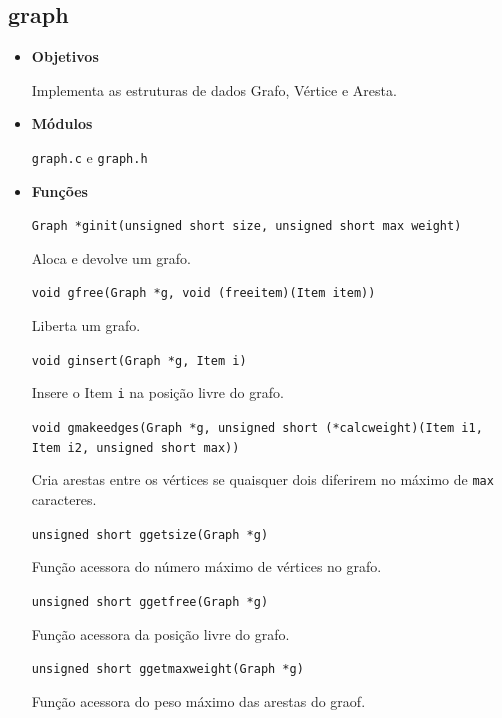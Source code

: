 \documentclass[portuguese, a4paper]{article}
\newcommand\tu[0]{\textunderscore}
\begin{document}
	\subsection{graph}
	\begin{itemize}
		\item \textbf{Objetivos}
		\par
		Implementa as estruturas de dados Grafo, Vértice e Aresta.

		\item \textbf{Módulos}
		\par
		\texttt{graph.c} e \texttt{graph.h}

		\item \textbf{Funções}
		\par
		\texttt{Graph *g\tu init(unsigned short size, unsigned short max\tu
		weight)}
		\par
		Aloca e devolve um grafo.

		\par\null\par
		\texttt{void g\tu free(Graph *g, void (free\tu item)(Item item))}
		\par
		Liberta um grafo.

		\par\null\par
		\texttt{void g\tu insert(Graph *g, Item i)}
		\par
		Insere o Item \texttt{i} na posição livre do grafo.

		\par\null\par
		\texttt{void g\tu make\tu edges(Graph *g, unsigned short (*calc\tu weight)(Item
				i1, Item i2, unsigned short max))}
		\par
		Cria arestas entre os vértices se quaisquer dois diferirem no máximo de
		\texttt{max} caracteres.

		\par\null\par
		\texttt{unsigned short g\tu get\tu size(Graph *g)}
		\par
		Função acessora do número máximo de vértices no grafo.

		\par\null\par
		\texttt{unsigned short g\tu get\tu free(Graph *g)}
		\par
		Função acessora da posição livre do grafo.

		\par\null\par
		\texttt{unsigned short g\tu get\tu max\tu weight(Graph *g)}
		\par
		Função acessora do peso máximo das arestas do graof.


\end{itemize}
\end{document}
